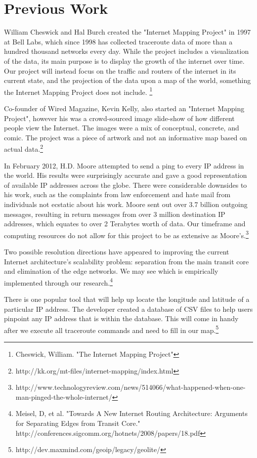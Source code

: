 \documentclass{sigcomm-alternate}
\begin{document}
\section{Previous Work}

William Cheswick and Hal Burch created the "Internet Mapping Project" in 1997 at Bell Labs, which since 1998 has collected traceroute data of more than a hundred thousand networks every day. While the project includes a visualization of the data, its main purpose is to display the growth of the internet over time. Our project will instead focus on the traffic and routers of the internet in its current state, and the projection of the data upon a map of the world, something the Internet Mapping Project does not include. \footnote{Cheswick, William. "The Internet Mapping Project"}

Co-founder of Wired Magazine, Kevin Kelly, also started an "Internet Mapping Project", however his was a crowd-sourced image slide-show of how different people view the Internet. The images were a mix of conceptual, concrete, and comic. The project was a piece of artwork and not an informative map based on actual data.\footnote{http://kk.org/mt-files/internet-mapping/index.html}

In February 2012, H.D. Moore attempted to send a ping to every IP address in the world. His results were surprisingly accurate and gave a good representation of available IP addresses across the globe. There were considerable downsides to his work, such as the complaints from law enforcement and hate mail from individuals not ecstatic about his work. Moore sent out over 3.7 billion outgoing messages, resulting in return messages from over 3 million destination IP addresses,  which equates to over 2 Terabytes worth of data.  Our timeframe and computing resources do not allow for this project to be as extensive as Moore's.\footnote{http://www.technologyreview.com/news/514066/what-happened-when-one-man-pinged-the-whole-internet/}

Two possible resolution directions have appeared to improving the current Internet architecture's scalability problem:  separation from the main transit core and elimination of the edge networks. We may see which is empirically implemented through our research.\footnote{Meisel, D, et al. "Towards A New Internet Routing Architecture: Arguments for Separating Edges from Transit Core." http://conferences.sigcomm.org/hotnets/2008/papers/18.pdf }

There is one popular tool that will help up locate the longitude and latitude of a particular IP address. The developer created a database of CSV files to help users pinpoint any IP address that is within the database. This will come in handy after we execute all traceroute commands and need to fill in our map.\footnote{http://dev.maxmind.com/geoip/legacy/geolite/}
\end{document}
